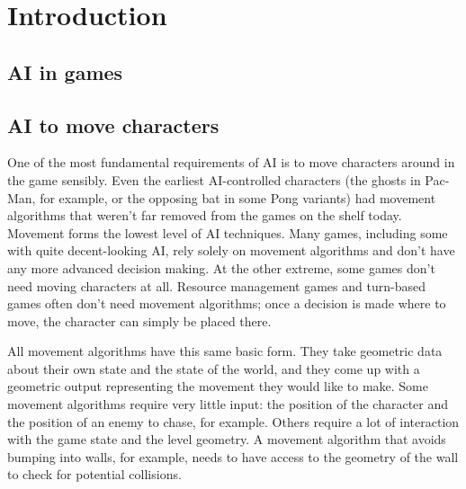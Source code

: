 \chapter{Introduction}

\section{AI in games}

\section{AI to move characters}
One of the most fundamental requirements of AI is to move characters around in the game sensibly. Even the earliest AI-controlled characters (the ghosts in Pac-Man, for example, or the opposing bat in some Pong variants) had movement algorithms that weren’t far removed from the games on the shelf today. Movement forms the lowest level of AI techniques. Many games, including some with quite decent-looking AI, rely solely on movement algorithms and don’t have any more advanced decision making. At the other extreme, some games don’t need moving characters at all. Resource management games and turn-based games often don’t need movement algorithms; once a decision is made where to move, the character can simply be placed there.

All movement algorithms have this same basic form. They take geometric data about their
own state and the state of the world, and they come up with a geometric output representing the movement they would like to make.
Some movement algorithms require very little input: the position of the character and the
position of an enemy to chase, for example. Others require a lot of interaction with the game
state and the level geometry. A movement algorithm that avoids bumping into walls, for example, needs to have access to the geometry of the wall to check for potential collisions.

